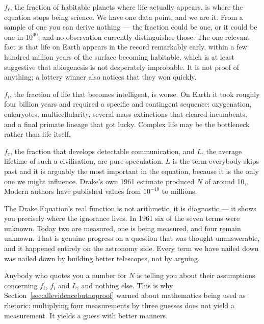 $f_\ell$, the fraction of habitable planets where life actually appears, is where the
equation stops being science. We have one data point, and we are it. From a sample of one you
can derive nothing --- the fraction could be one, or it could be one in $10^{40}$, and no
observation currently distinguishes those. The one relevant fact is that life on Earth
appears in the record remarkably early, within a few hundred million years of the surface
becoming habitable, which is at least suggestive that abiogenesis is not desperately
improbable. It is not proof of anything; a lottery winner also notices that they won quickly.

$f_i$, the fraction of life that becomes intelligent, is worse. On Earth it took roughly
four billion years and required a specific and contingent sequence: oxygenation, eukaryotes,
multicellularity, several mass extinctions that cleared incumbents, and a final primate
lineage that got lucky. Complex life may be the bottleneck rather than life itself.

$f_c$, the fraction that develops detectable communication, and $L$, the average lifetime of
such a civilisation, are pure speculation. $L$ is the term everybody skips past and it is
arguably the most important in the equation, because it is the only one we might influence.
Drake's own 1961 estimate produced $N$ of around 10,. Modern authors have published
values from $10^{-10}$ to millions.

\begin{funfact}
The Drake Equation's real function is not arithmetic, it is diagnostic --- it shows you
precisely where the ignorance lives. In 1961 six of the seven terms were unknown. Today two
are measured, one is being measured, and four remain unknown. That is genuine progress on a
question that was thought unanswerable, and it happened entirely on the astronomy side. Every
term we have nailed down was nailed down by building better telescopes, not by arguing.
\end{funfact}

 Anybody who
quotes you a number for $N$ is telling you about their assumptions concerning $f_\ell$, $f_i$
and $L$, and nothing else. This is why Section~\ref{sec:allevidencebutnoproof} warned about mathematics being used as
rhetoric: multiplying four measurements by three guesses does not yield a measurement. It
yields a guess with better manners.


